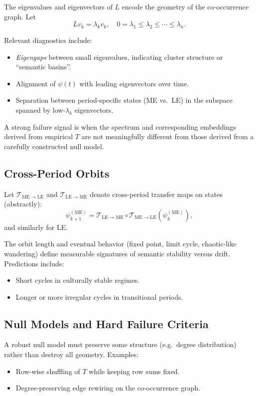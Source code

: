 \documentclass[11pt]{article}
\begin{document}
The eigenvalues and eigenvectors of \(L\) encode the geometry of the
co-occurrence graph. Let
\[
L v_k = \lambda_k v_k,\quad
0 = \lambda_1 \le \lambda_2 \le \cdots \le \lambda_n.
\]

Relevant diagnostics include:
\begin{itemize}[nosep]
  \item \emph{Eigengaps} between small eigenvalues, indicating cluster
        structure or ``semantic basins''.
  \item Alignment of \(\psi(t)\) with leading eigenvectors over time.
  \item Separation between period-specific states (ME vs.\ LE) in the
        subspace spanned by low-\(\lambda_k\) eigenvectors.
\end{itemize}

A strong failure signal is when the spectrum and corresponding
embeddings derived from empirical \(T\) are not meaningfully different
from those derived from a carefully constructed null model.

\subsection{Cross-Period Orbits}

Let \(\mathcal{T}_{\mathrm{ME}\to\mathrm{LE}}\) and
\(\mathcal{T}_{\mathrm{LE}\to\mathrm{ME}}\) denote cross-period
transfer maps on states (abstractly):
\[
\psi^{(\mathrm{ME})}_{k+1}
 = \mathcal{T}_{\mathrm{LE}\to\mathrm{ME}}
   \circ \mathcal{T}_{\mathrm{ME}\to\mathrm{LE}}
   (\psi^{(\mathrm{ME})}_k),
\]
and similarly for LE.

The orbit length and eventual behavior (fixed point, limit cycle,
chaotic-like wandering) define measurable signatures of semantic
stability versus drift. Predictions include:
\begin{itemize}[nosep]
  \item Short cycles in culturally stable regimes.
  \item Longer or more irregular cycles in transitional periods.
\end{itemize}

\subsection{Null Models and Hard Failure Criteria}

A robust null model must preserve some structure (e.g.\ degree
distribution) rather than destroy all geometry. Examples:
\begin{itemize}[nosep]
  \item Row-wise shuffling of \(T\) while keeping row sums fixed.
  \item Degree-preserving edge rewiring on the co-occurrence graph.
\end{itemize}
\end{document}

